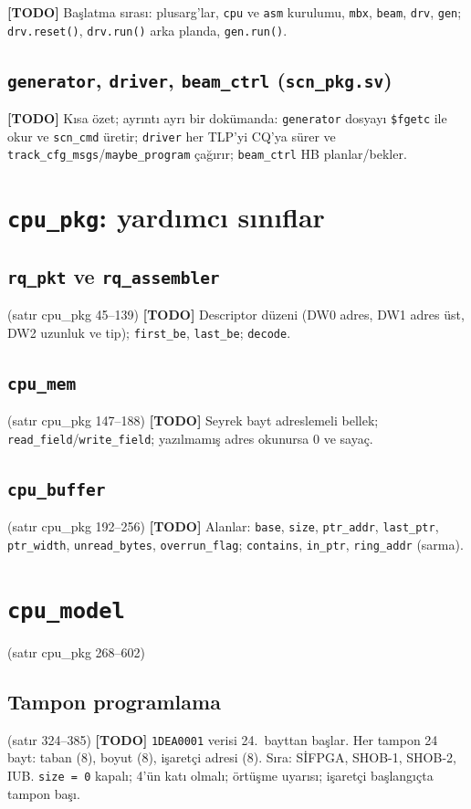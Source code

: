 \documentclass[11pt,a4paper]{article}
\newcommand{\kod}[1]{\texttt{#1}}
\newcommand{\todo}[1]{\textcolor{red!60!black}{\textbf{[TODO]} #1}}
\newcommand{\satir}[1]{\textcolor{black!60}{\scriptsize(satır #1)}}
\begin{document}
\todo{Başlatma sırası: plusarg'lar, \kod{cpu} ve \kod{asm} kurulumu, \kod{mbx},
\kod{beam}, \kod{drv}, \kod{gen}; \kod{drv.reset()}, \kod{drv.run()} arka planda,
\kod{gen.run()}.}

\subsection{\kod{generator}, \kod{driver}, \kod{beam\_ctrl} (\kod{scn\_pkg.sv})}
\todo{Kısa özet; ayrıntı ayrı bir dokümanda: \kod{generator} dosyayı \kod{\$fgetc}
ile okur ve \kod{scn\_cmd} üretir; \kod{driver} her TLP'yi CQ'ya sürer ve
\kod{track\_cfg\_msgs}/\kod{maybe\_program} çağırır; \kod{beam\_ctrl} HB
planlar/bekler.}

\section{\kod{cpu\_pkg}: yardımcı sınıflar}

\subsection{\kod{rq\_pkt} ve \kod{rq\_assembler}}
\satir{cpu\_pkg 45--139}
\todo{Descriptor düzeni (DW0 adres, DW1 adres üst, DW2 uzunluk ve tip); \kod{first\_be},
\kod{last\_be}; \kod{decode}.}

\subsection{\kod{cpu\_mem}}
\satir{cpu\_pkg 147--188}
\todo{Seyrek bayt adreslemeli bellek; \kod{read\_field}/\kod{write\_field}; yazılmamış
adres okunursa 0 ve sayaç.}

\subsection{\kod{cpu\_buffer}}
\satir{cpu\_pkg 192--256}
\todo{Alanlar: \kod{base}, \kod{size}, \kod{ptr\_addr}, \kod{last\_ptr},
\kod{ptr\_width}, \kod{unread\_bytes}, \kod{overrun\_flag}; \kod{contains},
\kod{in\_ptr}, \kod{ring\_addr} (sarma).}

\section{\kod{cpu\_model}}
\satir{cpu\_pkg 268--602}

\subsection{Tampon programlama}
\satir{324--385}
\todo{\kod{1DEA0001} verisi 24.\ bayttan başlar. Her tampon 24 bayt: taban (8), boyut (8),
işaretçi adresi (8). Sıra: SİFPGA, SHOB-1, SHOB-2, IUB. \kod{size = 0} kapalı;
4'ün katı olmalı; örtüşme uyarısı; işaretçi başlangıçta tampon başı.}
\end{document}
